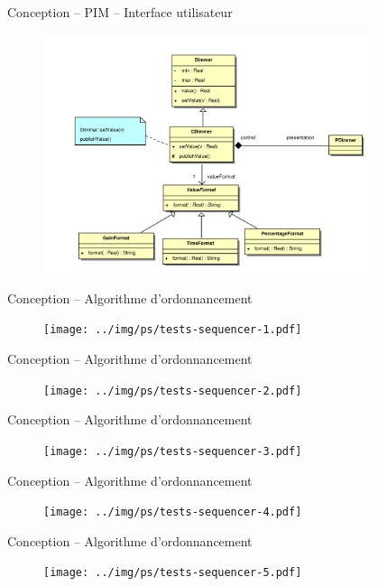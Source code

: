 \documentclass[frenchb]{beamer}
\begin{document}
\begin{frame}{Conception -- PIM -- Interface utilisateur}
    \begin{figure}
        \includegraphics[height=7cm]{../img/ps/pacdimmer-pim.pdf}
    \end{figure}
\end{frame}

\begin{frame}{Conception -- Algorithme d’ordonnancement}
    \pause
    \begin{figure}
        \texttt{[image: ../img/ps/tests-sequencer-1.pdf]}
    \end{figure}
\end{frame}

\begin{frame}{Conception -- Algorithme d’ordonnancement}
    \begin{figure}
        \texttt{[image: ../img/ps/tests-sequencer-2.pdf]}
    \end{figure}
\end{frame}

\begin{frame}{Conception -- Algorithme d’ordonnancement}
    \begin{figure}
        \texttt{[image: ../img/ps/tests-sequencer-3.pdf]}
    \end{figure}
\end{frame}

\begin{frame}{Conception -- Algorithme d’ordonnancement}
    \begin{figure}
        \texttt{[image: ../img/ps/tests-sequencer-4.pdf]}
    \end{figure}
\end{frame}

\begin{frame}{Conception -- Algorithme d’ordonnancement}
    \begin{figure}
        \texttt{[image: ../img/ps/tests-sequencer-5.pdf]}
    \end{figure}
\end{frame}
\end{document}
